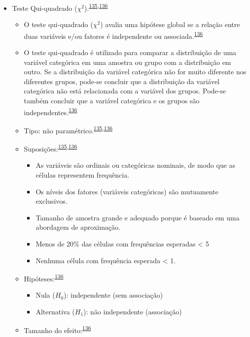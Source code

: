 \documentclass[
  a4paper,
]{book}
\begin{document}
\begin{itemize}
\item
  Teste Qui-quadrado (\(\chi^2\)).\textsuperscript{\protect\hyperlink{ref-McHugh2013}{135},\protect\hyperlink{ref-Kim2017a}{136}}

  \begin{itemize}
  \item
    O teste qui-quadrado (\(\chi^2\)) avalia uma hipótese global se a relação entre duas variáveis e/ou fatores é independente ou associada.\textsuperscript{\protect\hyperlink{ref-Kim2017a}{136}}
  \item
    O teste qui-quadrado é utilizado para comparar a distribuição de uma variável categórica em uma amostra ou grupo com a distribuição em outro. Se a distribuição da variável categórica não for muito diferente nos diferentes grupos, pode-se concluir que a distribuição da variável categórica não está relacionada com a variável dos grupos. Pode-se também concluir que a variável categórica e os grupos são independentes.\textsuperscript{\protect\hyperlink{ref-Kim2017a}{136}}
  \item
    Tipo: não paramétrico.\textsuperscript{\protect\hyperlink{ref-McHugh2013}{135},\protect\hyperlink{ref-Kim2017a}{136}}
  \item
    Suposições:\textsuperscript{\protect\hyperlink{ref-McHugh2013}{135},\protect\hyperlink{ref-Kim2017a}{136}}

    \begin{itemize}
    \item
      As variáveis são ordinais ou categóricas nominais, de modo que as células representem frequência.
    \item
      Os níveis dos fatores (variáveis categóricas) são mutuamente exclusivos.
    \item
      Tamanho de amostra grande e adequado porque é baseado em uma abordagem de aproximação.
    \item
      Menos de 20\% das células com frequências esperadas \textless{} 5
    \item
      Nenhuma célula com frequência esperada \textless{} 1.
    \end{itemize}
  \item
    Hipóteses:\textsuperscript{\protect\hyperlink{ref-Kim2017a}{136}}

    \begin{itemize}
    \item
      Nula (\(H_{0}\)): independente (sem associação)
    \item
      Alternativa (\(H_{1}\)): não independente (associação)
    \end{itemize}
  \item
    Tamanho do efeito:\textsuperscript{\protect\hyperlink{ref-Kim2017a}{136}}


\end{itemize}
\end{itemize}
\end{document}

